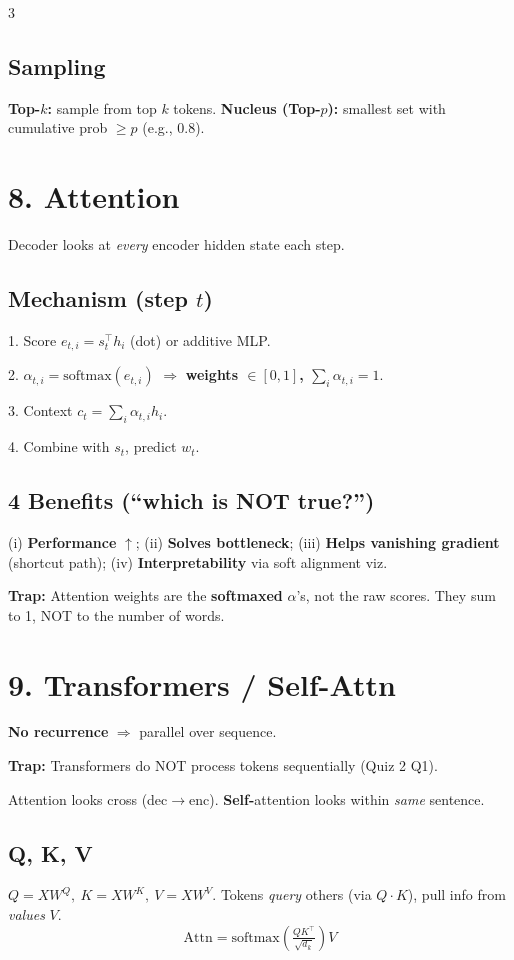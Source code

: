 \documentclass[8pt,a4paper,landscape]{extarticle}
\newcommand{\trap}[1]{{\small\colorbox{yellow!30}{\parbox{0.93\linewidth}{\textbf{\textcolor{red!70!black}{Trap:}} #1}}}}
\begin{document}
\begin{multicols*}{3}
    \subsection*{Sampling}
    \textbf{Top-$k$:} sample from top $k$ tokens. \textbf{Nucleus (Top-$p$):} smallest set with cumulative prob $\geq p$ (e.g., 0.8).

    \section*{8. Attention}
    Decoder looks at \emph{every} encoder hidden state each step.

    \subsection*{Mechanism (step $t$)}
    1. Score $e_{t,i}=s_t^\top h_i$ (dot) or additive MLP.

    2. $\alpha_{t,i}=\text{softmax}(e_{t,i})$ $\Rightarrow$ \textbf{weights $\in[0,1]$, $\sum_i\alpha_{t,i}=1$}.

    3. Context $c_t=\sum_i\alpha_{t,i}h_i$.

    4. Combine with $s_t$, predict $w_t$.

    \subsection*{4 Benefits (``which is NOT true?'')}
    (i) \textbf{Performance} $\uparrow$; (ii) \textbf{Solves bottleneck}; (iii) \textbf{Helps vanishing gradient} (shortcut path); (iv) \textbf{Interpretability} via soft alignment viz.

    \trap{Attention weights are the \textbf{softmaxed} $\alpha$'s, not the raw scores. They sum to 1, NOT to the number of words.}

    \section*{9. Transformers / Self-Attn}
    \textbf{No recurrence} $\Rightarrow$ parallel over sequence.
    \trap{Transformers do NOT process tokens sequentially (Quiz 2 Q1).}

    Attention looks cross (dec$\to$enc). \textbf{Self-}attention looks within \emph{same} sentence.

    \subsection*{Q, K, V}
    $Q=XW^Q,\ K=XW^K,\ V=XW^V$. Tokens \emph{query} others (via $Q\cdot K$), pull info from \emph{values} $V$.
    \[\text{Attn}=\text{softmax}\!\left(\tfrac{QK^\top}{\sqrt{d_k}}\right)V\]


\end{multicols*}
\end{document}
